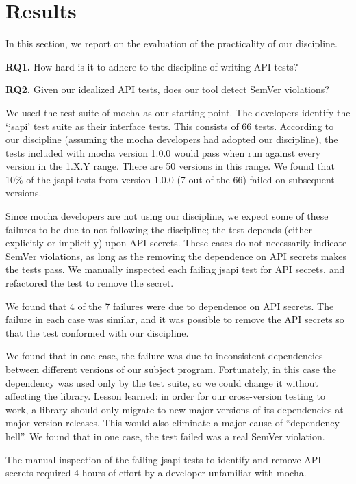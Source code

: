 \section{Results}

In this section, we report on the evaluation of the practicality of
our discipline.

{\bf RQ1.} How hard is it to adhere to the discipline of writing API tests?

{\bf RQ2.} Given our idealized API tests, does our tool detect SemVer violations?

We used the test suite of mocha as our starting point. The developers
identify the ‘jsapi’ test suite as their interface tests. This
consists of 66 tests. According to our discipline (assuming the mocha
developers had adopted our discipline), the tests included with mocha
version 1.0.0 would pass when run against every version in the 1.X.Y
range. There are 50 versions in this range. We found that 10\% of the
jsapi tests from version 1.0.0 (7 out of the 66) failed on subsequent
versions.

Since mocha developers are not using our discipline, we expect some of
these failures to be due to not following the discipline; the test
depends (either explicitly or implicitly) upon API secrets. These
cases do not necessarily indicate SemVer violations, as long as the
removing the dependence on API secrets makes the tests pass. We
manually inspected each failing jsapi test for API secrets, and
refactored the test to remove the secret.

We found that 4 of the 7 failures were due to dependence on API
secrets. The failure in each case was similar, and it was possible to
remove the API secrets so that the test conformed with our discipline.

We found that in one case, the failure was due to inconsistent
dependencies between different versions of our subject
program. Fortunately, in this case the dependency was used only by the
test suite, so we could change it without affecting the
library. Lesson learned: in order for our cross-version testing to
work, a library should only migrate to new major versions of its
dependencies at major version releases. This would also eliminate a
major cause of “dependency hell”.  We found that in one case, the test
failed was a real SemVer violation.

The manual inspection of the failing jsapi tests to identify and
remove API secrets required 4 hours of effort by a developer
unfamiliar with mocha.

